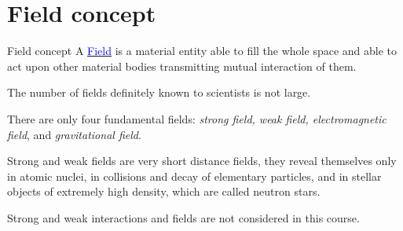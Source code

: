 \documentclass[10pt]{beamer}
\begin{document}
\section {Field concept} 
\begin{frame}[fragile]{Field concept}
%
A 
\href{https://en.wikipedia.org/wiki/Field_(physics)}{\textcolor{blue}{Field}}
is a material entity able to fill the whole space
and able to act upon other material bodies transmitting mutual
interaction of them.


     The number of fields definitely known to scientists is not large.
     
There are only \alert{four fundamental fields: {\it strong field, weak
field, electromagnetic field}, and {\it gravitational field}}.

 Strong
and weak fields are very short distance fields, they reveal themselves
only in atomic nuclei, in collisions and decay of elementary particles,
and in stellar objects of extremely high density, which are called
neutron stars. 

Strong and weak interactions and fields are not
considered in this course.

%
\end{frame}
\end{document}
